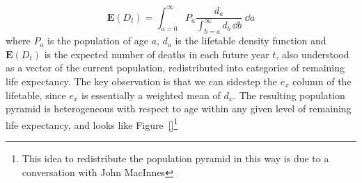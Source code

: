 \begin{equation}
\mathbf{E}(D_t) = \int _{a = 0} ^{\infty} P_a \frac{d_a}{\int _{b = a} ^{\infty}
d_b\, \dd b} \;\dd a
\end{equation}
where $P_a$ is the population of age $a$, $d_a$ is the
lifetable density function and $\mathbf{E}(D_t)$ is the expected number of
deaths in each future year $t$, also understood as a vector of the current 
population, redistributed into categories of remaining life expectancy. The key
observation is that we can sidestep the $e_x$ column of the lifetable, since
$e_x$ is essentially a weighted mean of $d_x$. The resulting population pyramid
is heterogeneous with respect to age within any given level of remaining life
expectancy, and looks like Figure~\ref{}\footnote{This idea to redistribute the
population pyramid in this way is due to a conversation with John MacInnes}
 









